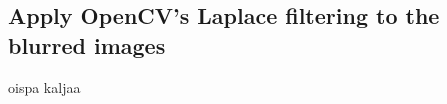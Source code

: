 \documentclass{article}
\begin{document}
 \par

\subsection{Apply OpenCV’s Laplace filtering to the blurred images}
oispa kaljaa
\end{document}
